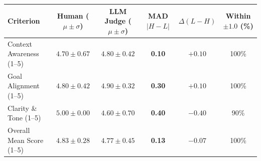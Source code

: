 \begin{tabular}{lccccc}
\toprule
Criterion & Human ($\mu \pm \sigma$) & LLM Judge ($\mu \pm \sigma$) & MAD $|H - L|$ & $\Delta (L - H)$ & Within $\pm 1.0$ (\%) \\
\midrule
Context Awareness (1--5) & $4.70 \pm 0.67$ & $4.80 \pm 0.42$ & \textbf{0.10} & $+0.10$ & 100\% \\
Goal Alignment (1--5) & $4.80 \pm 0.42$ & $4.90 \pm 0.32$ & \textbf{0.30} & $+0.10$ & 100\% \\
Clarity \& Tone (1--5) & $5.00 \pm 0.00$ & $4.60 \pm 0.70$ & \textbf{0.40} & $-0.40$ & 90\% \\
Overall Mean Score (1--5) & $4.83 \pm 0.28$ & $4.77 \pm 0.45$ & \textbf{0.13} & $-0.07$ & 100\% \\
\bottomrule
\end{tabular}
